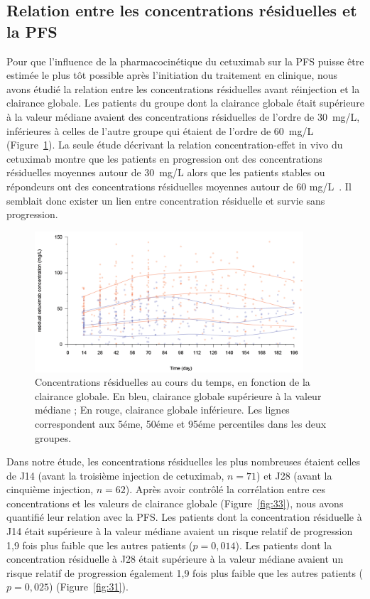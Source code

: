 \subsection{Relation entre les concentrations résiduelles et la PFS}
Pour que l'influence de la pharmacocinétique du cetuximab sur la PFS puisse être estimée le plus tôt possible après l'initiation du traitement en clinique, nous avons étudié la relation entre les concentrations résiduelles avant réinjection et la clairance globale. Les patients du groupe dont la clairance globale était supérieure à la valeur médiane avaient des concentrations résiduelles de l'ordre de 30~mg/L, inférieures à celles de l'autre groupe qui étaient de l'ordre de 60~mg/L (Figure~\ref{fig:29}). La seule étude décrivant la relation concentration-effet in vivo du cetuximab montre que les patients en progression ont des concentrations résiduelles moyennes autour de 30~mg/L alors que les patients stables ou répondeurs ont des concentrations résiduelles moyennes autour de 60 mg/L~\citep{REF122}. Il semblait donc exister un lien entre concentration résiduelle et survie sans progression. 
\begin{figure}[htbp]
	\centering
		\includegraphics[width=10cm]{figures/raster/FIG_29}
	\caption{Concentrations résiduelles au cours du temps, en fonction de la clairance globale. En bleu, clairance globale supérieure à la valeur médiane ; En rouge, clairance globale inférieure. Les lignes correspondent aux 5éme, 50éme et 95éme percentiles dans les deux groupes.}
	\label{fig:29}
\end{figure}
Dans notre étude, les concentrations résiduelles les plus nombreuses étaient celles de J14 (avant la troisième injection de cetuximab, $n = 71$) et J28 (avant la cinquième injection, $n = 62$). Après avoir contrôlé la corrélation entre ces concentrations et les valeurs de clairance globale (Figure~\ref{fig:33}), nous avons quantifié leur relation  avec la PFS. Les patients dont la concentration résiduelle à J14 était supérieure à la valeur médiane avaient un risque relatif de progression 1,9 fois plus faible que les autres patients ($p = 0,014$). Les patients dont la concentration résiduelle à J28 était supérieure à la valeur médiane avaient un risque relatif de progression également 1,9 fois plus faible que les autres patients ($p = 0,025$) (Figure~\ref{fig:31}).
